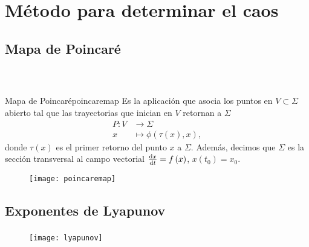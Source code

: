 \section{Método para determinar el caos}

\subsection{Mapa de Poincaré}

\begin{frame}
	\frametitle{\subsecname~\parencite[Capítulo 3]{Viana2021}}

	\begin{minipage}{0.6\textwidth}
		\begin{definition}{Mapa de Poincaré}{poincaremap}
			Es la aplicación que asocia los puntos en $V\subset\Sigma$ abierto
			tal que las trayectorias que inician en $V$ retornan a $\Sigma$
			\begin{align*}
				P\colon V & \to\Sigma                                      \\
				x         & \mapsto\phi\left(\tau\left(x\right), x\right),
			\end{align*}
			donde $\tau\left(x\right)$ es el primer retorno del punto $x$ a $\Sigma$.
			Además, decimos que $\Sigma$ es la sección transversal al campo vectorial
			$\diff{x}{t}=f\left(x\right)$, $x\left(t_{0}\right)=x_{0}$.
		\end{definition}
	\end{minipage}
	\begin{minipage}{0.3\textwidth}
		\begin{figure}[ht!]
			\centering
			\texttt{[image: poincaremap]}
		\end{figure}
	\end{minipage}

\end{frame}


\subsection{Exponentes de Lyapunov}

\begin{frame}
	\frametitle{\subsecname}

	\begin{figure}[ht!]
		\centering
		\texttt{[image: lyapunov]}
	\end{figure}
\end{frame}

